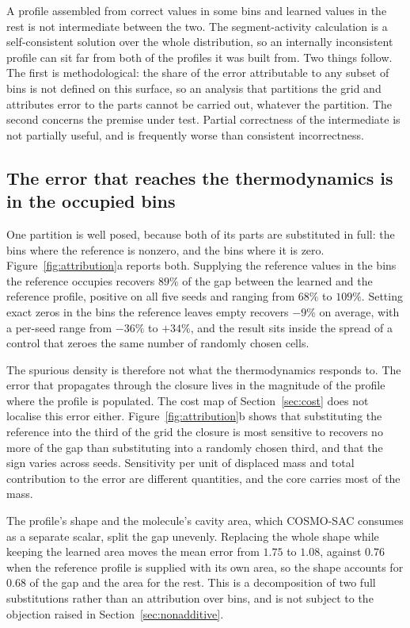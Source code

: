 A profile assembled from correct values in some bins and learned values in the rest is not
intermediate between the two. The segment-activity calculation is a self-consistent solution over
the whole distribution, so an internally inconsistent profile can sit far from both of the profiles
it was built from. Two things follow. The first is methodological: the share of the error
attributable to any subset of bins is not defined on this surface, so an analysis that partitions
the grid and attributes error to the parts cannot be carried out, whatever the partition. The
second concerns the premise under test. Partial correctness of the intermediate is not partially
useful, and is frequently worse than consistent incorrectness.

\subsection{The error that reaches the thermodynamics is in the occupied bins}
\label{sec:attribution}

One partition is well posed, because both of its parts are substituted in full: the bins where the
reference is nonzero, and the bins where it is zero. Figure~\ref{fig:attribution}a reports both.
Supplying the reference values in the bins the reference occupies recovers $89\%$ of the gap
between the learned and the reference profile, positive on all five seeds and ranging from $68\%$
to $109\%$. Setting exact zeros in the bins the reference leaves empty recovers $-9\%$ on average,
with a per-seed range from $-36\%$ to $+34\%$, and the result sits inside the spread of a control
that zeroes the same number of randomly chosen cells.

The spurious density is therefore not what the thermodynamics responds to. The error that
propagates through the closure lives in the magnitude of the profile where the profile is
populated. The cost map of Section~\ref{sec:cost} does not localise this error either.
Figure~\ref{fig:attribution}b shows that substituting the reference into the third of the grid the
closure is most sensitive to recovers no more of the gap than substituting into a randomly chosen
third, and that the sign varies across seeds. Sensitivity per unit of displaced mass and total
contribution to the error are different quantities, and the core carries most of the mass.

The profile's shape and the molecule's cavity area, which COSMO-SAC consumes as a separate scalar,
split the gap unevenly. Replacing the whole shape while keeping the learned area moves the mean
error from $1.75$ to $1.08$, against $0.76$ when the reference profile is supplied with its own
area, so the shape accounts for $0.68$ of the gap and the area for the rest. This is a
decomposition of two full substitutions rather than an attribution over bins, and is not subject to
the objection raised in Section~\ref{sec:nonadditive}.


